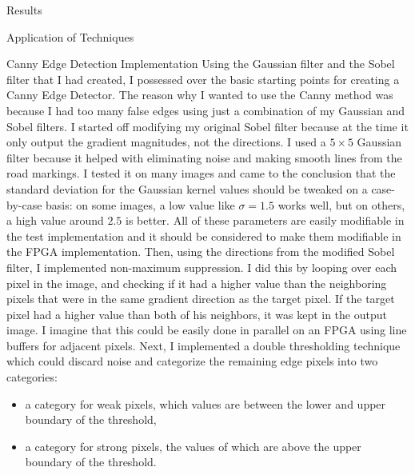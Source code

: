 \documentclass{matthijs}
\begin{document}
\begin{hoofdstuk}{Results}
\begin{paragraaf}{Application of Techniques}
\begin{subparagraaf}{Canny Edge Detection Implementation}
				Using the Gaussian filter and the Sobel filter that I had created, I possessed over the basic starting points for creating a Canny Edge Detector.
				The reason why I wanted to use the Canny method was because I had too many false edges using just a combination of my Gaussian and Sobel filters.
				I started off modifying my original Sobel filter because at the time it only output the gradient magnitudes, not the directions.
				I used a $5 \times 5$ Gaussian filter because it helped with eliminating noise and making smooth lines from the road markings.
				I tested it on many images and came to the conclusion that the standard deviation for the Gaussian kernel values should be tweaked on a case-by-case basis: on some images, a low value like $\sigma = 1.5$ works well, but on others, a high value around $2.5$ is better.
				All of these parameters are easily modifiable in the test implementation and it should be considered to make them modifiable in the FPGA implementation.
				Then, using the directions from the modified Sobel filter, I implemented non-maximum suppression.
				I did this by looping over each pixel in the image, and checking if it had a higher value than the neighboring pixels that were in the same gradient direction as the target pixel.
				If the target pixel had a higher value than both of his neighbors, it was kept in the output image.
				I imagine that this could be easily done in parallel on an FPGA using line buffers for adjacent pixels.
				Next, I implemented a double thresholding technique which could discard noise and categorize the remaining edge pixels into two categories:

				\begin{itemize}
					\item	a category for weak pixels, which values are between the lower and upper boundary of the threshold,
					\item	a category for strong pixels, the values of which are above the upper boundary of the threshold.
				\end{itemize}


\end{subparagraaf}
\end{paragraaf}
\end{hoofdstuk}
\end{document}

